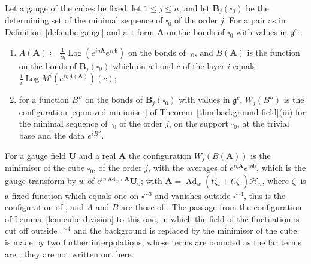 \documentclass[11pt]{preprint}
\newcommand{\Ad}{\operatorname{Ad}}
\numberwithin{equation}{section}
\begin{document}
\begin{definition}\label{def:near-data}
Let a gauge of the cubes be fixed, let $1 \leqslant j \leqslant n$, and let $\mathbf B_j(\square_0)$ be the determining set of the minimal sequence of $\square_0$ of the order $j$. For a pair as in Definition~\ref{def:cube-gauge} and a $1$-form $\mathbf A$ on the bonds of $\square_0$ with values in $\mathfrak g^c$:
\begin{enumerate}[label=(\roman*)]
\item $A(\mathbf A) \coloneqq \frac{1}{i\eta}\operatorname{Log}(e^{i\eta\mathbf A}e^{i\eta\mathfrak h})$ on the bonds of $\square_0$, and $B(\mathbf A)$ is the function on the bonds of $\mathbf B_j(\square_0)$ which on a bond $c$ of the layer $i$ equals $\frac{1}{i}\operatorname{Log}M^i(e^{i\eta A(\mathbf A)})(c)$;
\item for a function $B''$ on the bonds of $\mathbf B_j(\square_0)$ with values in $\mathfrak g^c$, $W_j(B'')$ is the configuration \eqref{eq:moved-minimiser} of Theorem~\ref{thm:background-field}(iii) for the minimal sequence of $\square_0$ of the order $j$, on the support $\square_0$, at the trivial base and the data $e^{iB''}$.
\end{enumerate}
\end{definition}

For a gauge field $\mathbf U$ and a real $\mathbf A$ the configuration $W_j(B(\mathbf A))$ is the minimiser of the cube $\square_0$, of the order $j$, with the averages of $e^{i\eta\mathbf A}e^{i\eta\mathfrak h}$, which is the gauge transform by $w$ of $e^{i\eta \Ad_{w^{-1}}\mathbf A}\mathbf U_0$; with $\mathbf A = \Ad_w(t\tilde\zeta_\square + t_\square\zeta_\square)\mathcal H_n$, where $\tilde\zeta_\square$ is a fixed function which equals one on $\square^{\sim3}$ and vanishes outside $\square^{\sim4}$, this is the configuration of \cite[(3.25), (3.28)]{BalabanRG1}, and $A$ and $B$ are those of \cite[(3.30)]{BalabanRG1}. The passage from the configuration of Lemma~\ref{lem:cube-division} to this one, in which the field of the fluctuation is cut off outside $\square^{\sim4}$ and the background is replaced by the minimiser of the cube, is made by two further interpolations, whose terms are bounded as the far terms are \cite[(3.21), (3.22)]{BalabanRG1}; they are not written out here.
\end{document}
